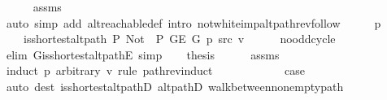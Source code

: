 \begin{isabellebody}
\ \ \ \ \isamarkupfalse%
\ assms\isanewline
\ \ \ \ \isamarkupfalse%
\ {\isacharparenleft}{\kern0pt}auto\ simp\ add{\isacharcolon}{\kern0pt}\ alt{\isacharunderscore}{\kern0pt}reachable{\isacharunderscore}{\kern0pt}def\ intro{\isacharcolon}{\kern0pt}\ not{\isacharunderscore}{\kern0pt}white{\isacharunderscore}{\kern0pt}imp{\isacharunderscore}{\kern0pt}alt{\isacharunderscore}{\kern0pt}path{\isacharunderscore}{\kern0pt}rev{\isacharunderscore}{\kern0pt}follow{\isacharparenright}{\kern0pt}\isanewline
\ \ \isamarkupfalse%
\ \isamarkupfalse%
\ p\ \isanewline
\ \ \ \ {\isachardoublequoteopen}is{\isacharunderscore}{\kern0pt}shortest{\isacharunderscore}{\kern0pt}alt{\isacharunderscore}{\kern0pt}path\ P{\isacharprime}{\kern0pt}{\isacharprime}{\kern0pt}\ {\isacharparenleft}{\kern0pt}Not\ {\isasymcirc}\ P{\isacharprime}{\kern0pt}{\isacharprime}{\kern0pt}{\isacharparenright}{\kern0pt}\ {\isacharparenleft}{\kern0pt}G{\isachardot}{\kern0pt}E\ G{\isacharparenright}{\kern0pt}\ p\ src\ v{\isachardoublequoteclose}\isanewline
\ \ \ \ \isamarkupfalse%
\ no{\isacharunderscore}{\kern0pt}odd{\isacharunderscore}{\kern0pt}cycle\isanewline
\ \ \ \ \isamarkupfalse%
\ {\isacharparenleft}{\kern0pt}elim\ G{\isachardot}{\kern0pt}is{\isacharunderscore}{\kern0pt}shortest{\isacharunderscore}{\kern0pt}alt{\isacharunderscore}{\kern0pt}pathE{\isacharparenright}{\kern0pt}\ simp{\isacharplus}{\kern0pt}\isanewline
\ \ \isamarkupfalse%
\ {\isacharquery}{\kern0pt}thesis\isanewline
\ \ \ \ \isamarkupfalse%
\ assms\isanewline
\ \ \isamarkupfalse%
\ {\isacharparenleft}{\kern0pt}induct\ p\ arbitrary{\isacharcolon}{\kern0pt}\ v\ rule{\isacharcolon}{\kern0pt}\ path{\isacharunderscore}{\kern0pt}rev{\isacharunderscore}{\kern0pt}induct{\isacharparenright}{\kern0pt}\isanewline
\ \ \ \ \isamarkupfalse%
\ {}\isanewline
\ \ \ \ \isamarkupfalse%
\ {\isacharquery}{\kern0pt}case\isanewline
\ \ \ \ \ \ \isamarkupfalse%
\ {\isacharparenleft}{\kern0pt}auto\ dest{\isacharcolon}{\kern0pt}\ is{\isacharunderscore}{\kern0pt}shortest{\isacharunderscore}{\kern0pt}alt{\isacharunderscore}{\kern0pt}pathD{\isacharparenleft}{\kern0pt}{}{\isacharparenright}{\kern0pt}\ alt{\isacharunderscore}{\kern0pt}pathD{\isacharparenleft}{\kern0pt}{}{\isacharparenright}{\kern0pt}\ walk{\isacharunderscore}{\kern0pt}between{\isacharunderscore}{\kern0pt}nonempty{\isacharunderscore}{\kern0pt}path{\isacharparenleft}{\kern0pt}{}{\isacharparenright}{\kern0pt}{\isacharparenright}{\kern0pt}\isanewline

\end{isabellebody}
